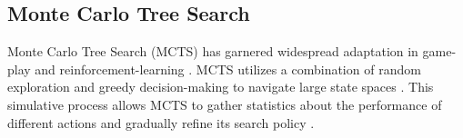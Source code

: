 \documentclass[runningheads]{llncs}
\begin{document}




\subsection{Monte Carlo Tree Search}\label{subsec:MonteCarlo TreeSearch}

Monte Carlo Tree Search (MCTS) has garnered widespread adaptation in game-play and reinforcement-learning \cite{Silver2016} \cite{Swiechowski2023}. MCTS utilizes a combination of random exploration and greedy decision-making to navigate large state spaces  \cite{Swiechowski2023}. This simulative process allows MCTS to gather statistics about the performance of different actions and gradually refine its search policy \cite{Swiechowski2023}.
\end{document}

